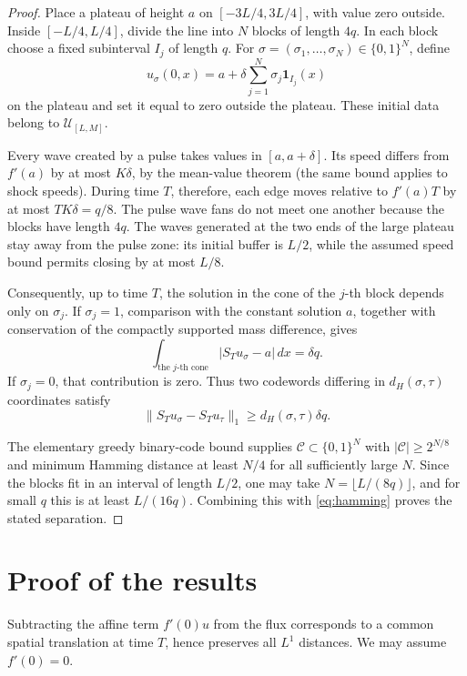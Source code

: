 \documentclass[11pt]{article}
\newcommand{\Uclass}{\mathcal U}
\begin{document}
\begin{proof}
Place a plateau of height \(a\) on \([-3L/4,3L/4]\), with value zero
outside.  Inside \([-L/4,L/4]\), divide the line into \(N\) blocks of
length \(4q\).  In each block choose a fixed subinterval \(I_j\) of length
\(q\).  For \(\sigma=(\sigma_1,\ldots,\sigma_N)\in\{0,1\}^N\), define
\[
 u_\sigma(0,x)=a+\delta\sum_{j=1}^N\sigma_j\mathbf1_{I_j}(x)
\]
on the plateau and set it equal to zero outside the plateau.  These initial
data belong to \(\Uclass_{[L,M]}\).

Every wave created by a pulse takes values in \([a,a+\delta]\).  Its speed
differs from \(f'(a)\) by at most \(K\delta\), by the mean-value theorem
(the same bound applies to shock speeds).  During time \(T\), therefore,
each edge moves relative to \(f'(a)T\) by at most
\(TK\delta=q/8\).  The pulse wave fans do not meet one another because the
blocks have length \(4q\).  The waves generated at the two ends of the large
plateau stay away from the pulse zone: its initial buffer is \(L/2\), while
the assumed speed bound permits closing by at most \(L/8\).

Consequently, up to time \(T\), the solution in the cone of the \(j\)-th
block depends only on \(\sigma_j\).  If \(\sigma_j=1\), comparison with the
constant solution \(a\), together with conservation of the compactly
supported mass difference, gives
\[
 \int_{\text{the }j\text{-th cone}}|S_Tu_\sigma-a|\,dx=\delta q.
\]
If \(\sigma_j=0\), that contribution is zero.  Thus two codewords differing
in \(d_H(\sigma,\tau)\) coordinates satisfy
\begin{equation}\label{eq:hamming}
 \|S_Tu_\sigma-S_Tu_\tau\|_1
 \geq d_H(\sigma,\tau)\delta q.
\end{equation}

The elementary greedy binary-code bound supplies
\(\mathcal C\subset\{0,1\}^N\) with
\(|\mathcal C|\geq2^{N/8}\) and minimum Hamming distance at least \(N/4\)
for all sufficiently large \(N\).  Since the blocks fit in an interval of
length \(L/2\), one may take \(N=\lfloor L/(8q)\rfloor\), and for small
\(q\) this is at least \(L/(16q)\).  Combining this with
\eqref{eq:hamming} proves the stated separation.
\end{proof}

\section*{Proof of the results}

Subtracting the affine term \(f'(0)u\) from the flux corresponds to a common
spatial translation at time \(T\), hence preserves all \(L^1\) distances.
We may assume \(f'(0)=0\).
\end{document}
